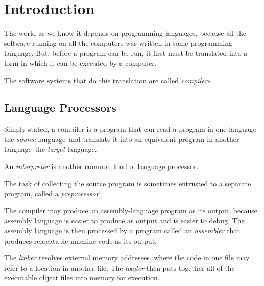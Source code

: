 \documentclass[12pt,a4paper,twoside,openany]{book}
\begin{document}

\restoregeometry
\thispagestyle{empty}
\setcounter{page}{0}
\tableofcontents
\thispagestyle{empty}
\setcounter{page}{0}

\chapter{Introduction}

The world as we know it depends on programming languages, because all the software running on all the computers was written in some programming language. But, before a program can be run, it first must be translated into a form in which it can be executed by a computer.

The software systems that do this translation are called \textit{compilers}.

\section{Language Processors}

Simply stated, a compiler is a program that can read a program in one language--the \textit{source} language--and translate it into an equivalent program in another language--the \textit{target} language.

An \textit{interpreter} is another common kind of language processor.

The task of collecting the source program is sometimes entrusted to a separate program, called a \textit{preprocessor}.

The compiler may produce an assembly-language program as its output, because assembly language is easier to produce as output and is easier to debug. The assembly language is then processed by a program called an \textit{assembler} that produces relocatable machine code as its output.

The \textit{linker} resolves external memory addresses, where the code in one file may refer to a location in another file. The \textit{loader} then puts together all of the executable object files into memory for execution.
\end{document}

